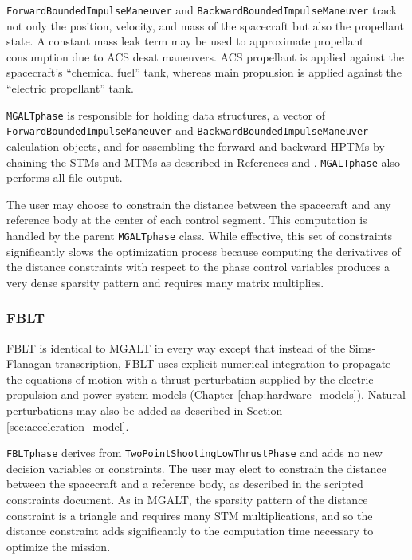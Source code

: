 \texttt{ForwardBoundedImpulseManeuver} and \texttt{BackwardBoundedImpulseManeuver} track not only the position, velocity, and mass of the spacecraft but also the propellant state. A constant mass leak term may be used to approximate propellant consumption due to \ac{ACS} desat maneuvers. \ac{ACS} propellant is applied against the spacecraft's ``chemical fuel'' tank, whereas main propulsion is applied against the ``electric propellant'' tank.

\texttt{MGALTphase} is responsible for holding data structures, a vector of \texttt{ForwardBoundedImpulseManeuver} and \texttt{BackwardBoundedImpulseManeuver} calculation objects, and for assembling the forward and backward \ac{HPTM}s by chaining the \ac{STM}s and \ac{MTM}s as described in References \cite{BoundedImpulseDerivatives1} and \cite{BoundedImpulseDerivatives2}. \texttt{MGALTphase} also performs all file output.

The user may choose to constrain the distance between the spacecraft and any reference body at the center of each control segment. This computation is handled by the parent \texttt{MGALTphase} class. While effective, this set of constraints significantly slows the optimization process because computing the derivatives of the distance constraints with respect to the phase control variables produces a very dense sparsity pattern and requires many matrix multiplies.

\subsubsection{FBLT}
\label{subsubsec:FBLT}

\ac{FBLT} is identical to \ac{MGALT} in every way except that instead of the Sims-Flanagan transcription, \ac{FBLT} uses explicit numerical integration to propagate the equations of motion with a thrust perturbation supplied by the electric propulsion and power system models (Chapter \ref{chap:hardware_models}). Natural perturbations may also be added as described in Section \ref{sec:acceleration_model}.

\texttt{FBLTphase} derives from \texttt{TwoPointShootingLowThrustPhase} and adds no new decision variables or constraints. The user may elect to constrain the distance between the spacecraft and a reference body, as described in the scripted constraints document. As in \ac{MGALT}, the sparsity pattern of the distance constraint is a triangle and requires many \ac{STM} multiplications, and so the distance constraint adds significantly to the computation time necessary to optimize the mission.

